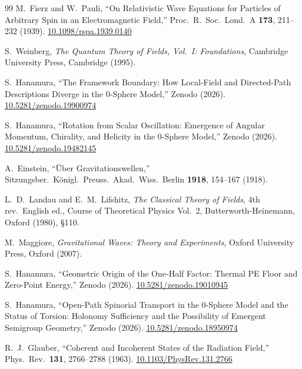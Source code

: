 \documentclass[%
 reprint, amsmath,amssymb, aps, prb, ]{revtex4-2}
\numberwithin{equation}{section}
\begin{document}
\begin{thebibliography}{99}
M.~Fierz and W.~Pauli, ``On Relativistic Wave Equations for Particles of
Arbitrary Spin in an Electromagnetic Field,''
Proc.\ R.\ Soc.\ Lond.\ A \textbf{173}, 211--232 (1939).
\href{https://doi.org/10.1098/rspa.1939.0140}{10.1098/rspa.1939.0140}

S.~Weinberg, \textit{The Quantum Theory of Fields, Vol.~I: Foundations},
Cambridge University Press, Cambridge (1995).

S.~Hanamura,
``The Framework Boundary: How Local-Field and Directed-Path Descriptions Diverge in the 0-Sphere Model,''
Zenodo (2026). \href{https://doi.org/10.5281/zenodo.19900974}{10.5281/zenodo.19900974}

S.~Hanamura, ``Rotation from Scalar Oscillation: Emergence of Angular Momentum,
Chirality, and Helicity in the 0-Sphere Model,'' Zenodo (2026). \href{https://doi.org/10.5281/zenodo.19482145}{10.5281/zenodo.19482145}

A.~Einstein, ``\"{U}ber Gravitationswellen,''
Sitzungsber.\ K\"{o}nigl.\ Preuss.\ Akad.\ Wiss.\ Berlin \textbf{1918}, 154--167 (1918).

L.~D.~Landau and E.~M.~Lifshitz, \textit{The Classical Theory of Fields},
4th rev.\ English ed., Course of Theoretical Physics Vol.~2,
Butterworth-Heinemann, Oxford (1980), \S110.

M.~Maggiore, \textit{Gravitational Waves: Theory and Experiments},
Oxford University Press, Oxford (2007).

S.~Hanamura, ``Geometric Origin of the One-Half Factor: Thermal PE Floor
and Zero-Point Energy,'' Zenodo (2026). \href{https://doi.org/10.5281/zenodo.19010945}{10.5281/zenodo.19010945}

S.~Hanamura,
``Open-Path Spinorial Transport in the 0-Sphere Model and the Status of Torsion: Holonomy Sufficiency and the Possibility of Emergent Semigroup Geometry,''
Zenodo (2026). \href{https://doi.org/10.5281/zenodo.18950974}{10.5281/zenodo.18950974}

R.~J.~Glauber, ``Coherent and Incoherent States of the Radiation Field,''
Phys.\ Rev.\ \textbf{131}, 2766--2788 (1963).
\href{https://doi.org/10.1103/PhysRev.131.2766}{10.1103/PhysRev.131.2766}

\end{thebibliography}

\appendix
\end{document}
